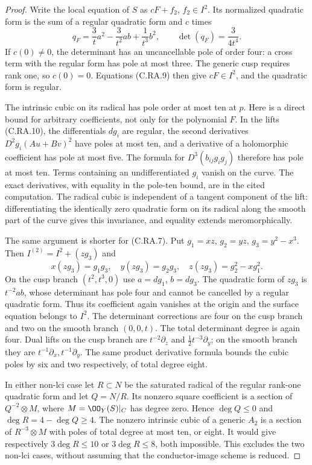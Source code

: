 \begin{proof}
Write the local equation of $S$ as $cF+f_2$, $f_2\in I^2$.
Its normalized quadratic form is the sum of a regular
quadratic form and $c$ times
\[
 q_F=\frac3t a^2-\frac3{t^2}ab+\frac1{t^3}b^2,
 \qquad \det(q_F)=\frac3{4t^4}.                  \tag{C.RA.11}
\]
If $c(0)\ne0$, the determinant has an uncancellable
pole of order four: a cross term with the regular form
has pole at most three. The generic cusp requires rank
one, so $c(0)=0$. Equations (C.RA.9) then give
$cF\in I^2$, and the quadratic form is regular.

The intrinsic cubic on its radical has pole order at most
ten at $p$. Here is a direct bound for arbitrary coefficients,
not only for the polynomial $F$. In the lifts (C.RA.10),
the differentials $dg_i$ are regular, the second derivatives
$D^2g_i(Au+Bv)^2$ have poles at most ten, and a derivative
of a holomorphic coefficient has pole at most five.
The formula for $D^3(b_{ij}g_i g_j)$ therefore has pole
at most ten. Terms containing an undifferentiated $g_i$
vanish on the curve. The exact derivatives, with equality
in the pole-ten bound, are in the cited computation.
The radical cubic is independent of a tangent component
of the lift: differentiating the identically zero quadratic
form on its radical along the smooth part of the curve
gives this invariance, and equality extends meromorphically.

The same argument is shorter for (C.RA.7). Put
$g_1=xz$, $g_2=yz$, $g_3=y^2-x^3$. Then
$I^{(2)}=I^2+(z g_3)$ and
\[
 x(zg_3)=g_1g_3,\quad y(zg_3)=g_2g_3,\quad
 z(zg_3)=g_2^2-xg_1^2.
 \tag{C.RA.12}
\]
On the cusp branch $(t^2,t^3,0)$ use $a=dg_1$, $b=dg_3$.
The quadratic form of $z g_3$ is $t^{-2}ab$, whose
determinant has pole four and cannot be cancelled by a
regular quadratic form. Thus its coefficient again
vanishes at the origin and the surface equation belongs
to $I^2$. The determinant corrections are four on the
cusp branch and two on the smooth branch $(0,0,t)$.
The total determinant degree is again four.
Dual lifts on the cusp branch are
$t^{-2}\partial_z$ and $\frac12t^{-3}\partial_y$;
on the smooth branch they are
$t^{-1}\partial_x,t^{-1}\partial_y$.
The same product derivative formula bounds the cubic
poles by six and two respectively, of total degree eight.

In either non-lci case let $R\subset N$ be the saturated
radical of the regular rank-one quadratic form and let
$Q=N/R$. Its nonzero square coefficient is a section of
$Q^{-2}\otimes M$, where $M=\OO_Y(S)|_C$ has degree
zero. Hence $\deg Q\le0$ and $\deg R=4-\deg Q\ge4$.
The nonzero intrinsic cubic of a generic $A_2$ is a
section of $R^{-3}\otimes M$ with poles of total degree
at most ten, or eight. It would give respectively
$3\deg R\le10$ or $3\deg R\le8$, both impossible.
This excludes the two non-lci cases, without assuming
that the conductor-image scheme is reduced.


\end{proof}

